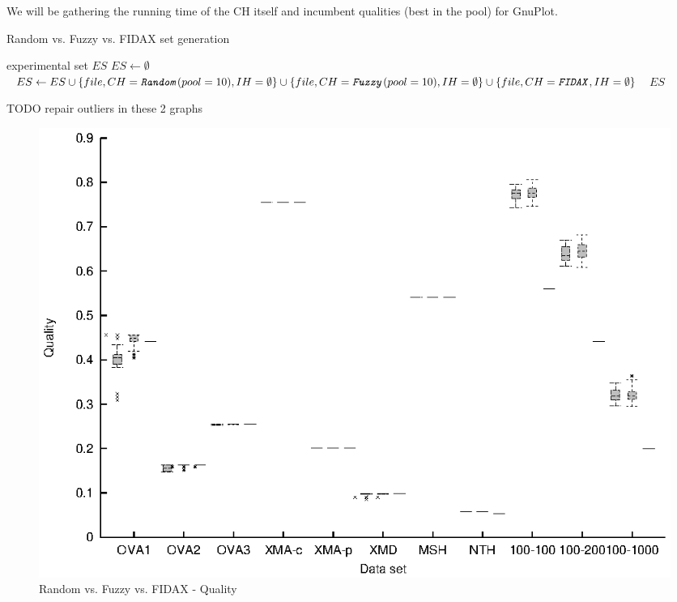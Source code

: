We will be gathering the running time of the CH itself and incumbent qualities (best in the pool) for GnuPlot.

\begin{algorithm}
\caption{Random vs. Fuzzy vs. FIDAX set generation}
\label{listing-experiment-random-fuzzy-fidax}
\begin{algorithmic}
\ENSURE experimental set $ES$
\STATE $ES \gets \emptyset$
    \STATE $ES \gets ES \cup \{file, CH = \texttt{\textit{Random}}(pool = 10), IH = \emptyset\} \cup \{file, CH = \texttt{\textit{Fuzzy}}(pool = 10), IH = \emptyset\} \cup \{file, CH = \texttt{\textit{FIDAX}}, IH = \emptyset\}$
  \ENDFOR
\ENDFOR
\RETURN $ES$
\end{algorithmic}
\end{algorithm}

TODO repair outliers in these 2 graphs

\begin{figure}
  \caption{Random vs. Fuzzy vs. FIDAX - Quality}
  \label{image-experiment-random-fuzzy-fidax-quality}
  \centering
    \includegraphics[width=\textwidth]{images/experiments/random-fuzzy-fidax-quality}
\end{figure}

